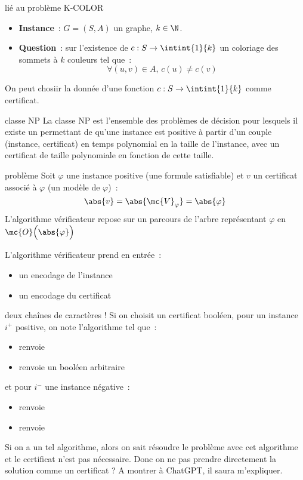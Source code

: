 \begin{exemple}{}{lié au problème K-COLOR}
    \begin{itemize}
        \item \textbf{Instance}~: $G=(S,A)$ un graphe, $k \in \N$.
        \item \textbf{Question}~: sur l'existence de $c:S\to \intint{1}{k}$ un coloriage des sommets à $k$ couleurs tel que~:
        $$\forall (u,v) \in A,\, c(u) \neq c(v)$$
    \end{itemize}
    On peut chosiir la donnée d'une fonction $c:S\to\intint{1}{k}$ comme certificat.
\end{exemple}

\begin{definition}{}{classe NP}
    La classe NP est l'ensemble des problèmes de décision pour lesquels il existe un  permettant de  qu'une instance est positive à partir d'un couple (instance, certificat) en temps polynomial en la taille de l'instance, avec un certificat de taille polynomiale en fonction de cette taille.
\end{definition}

\begin{exemple}{}{problème \sat}
    Soit $\varphi$ une instance positive (une formule satisfiable) et $v$ un certificat associé à $\varphi$ (un modèle de $\varphi$)~:
    $$\abs{v} = \abs{\mc{V}_\varphi} = \abs{\varphi}$$
    L'algorithme vérificateur repose sur un parcours de l'arbre représentant $\varphi$ en $\mc{O}\Big(\abs{\varphi}\Big)$
\end{exemple}

\begin{remarque}{}{}
    L'algorithme vérificateur prend en entrée~:
    \begin{itemize}
        \item un encodage de l'instance
        \item un encodage du certificat
    \end{itemize}
    deux chaînes de caractères ! Si on choisit un certificat booléen, pour un instance $i^+$ positive, on note  l'algorithme tel que~:
    \begin{itemize}
        \item {} renvoie 
        \item {} renvoie un booléen arbitraire
    \end{itemize}
    et pour $i^-$ une instance négative~:
    \begin{itemize}
        \item {} renvoie 
        \item {} renvoie 
    \end{itemize}
    Si on a un tel algorithme, alors on sait résoudre le problème avec cet algorithme et le certificat n'est pas nécessaire. Donc on ne pas prendre directement la solution comme un certificat ? 
    A montrer à ChatGPT, il saura m'expliquer.
\end{remarque}

